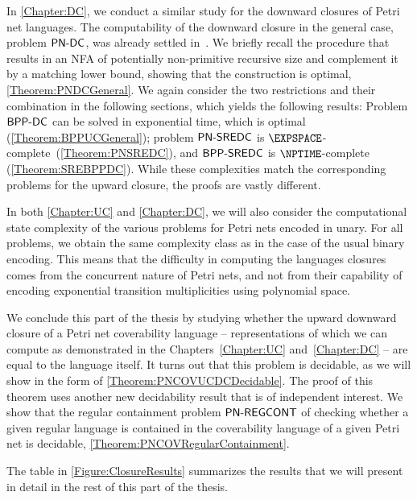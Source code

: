 \documentclass[../../diss.tex]{subfiles}
\begin{document}
In \cref{Chapter:DC}, we conduct a similar study for the downward closures of Petri net languages.
The computability of the downward closure in the general case, problem $\mathsf{PN\text{-}DC}$, was already settled in~\cite{HabermehlMW10}.
We briefly recall the procedure that results in an NFA of potentially non-primitive recursive size and complement it by a matching lower bound, showing that the construction is optimal, \cref{Theorem:PNDCGeneral}.
We again consider the two restrictions and their combination in the following sections, which yields the following results:
Problem $\mathsf{BPP\text{-}DC}$ can be solved in exponential time, which is optimal (\cref{Theorem:BPPUCGeneral}); problem $\mathsf{PN\text{-}SREDC}$ is $\EXPSPACE$-complete~(\cref{Theorem:PNSREDC}), and $\mathsf{BPP\text{-}SREDC}$ is $\NPTIME$-complete (\cref{Theorem:SREBPPDC}).
While these complexities match the corresponding problems for the upward closure, the proofs are vastly different.

In both \cref{Chapter:UC} and \cref{Chapter:DC}, we will also consider the computational \resp state complexity of the various problems for Petri nets encoded in unary.
For all problems, we obtain the same complexity class as in the case of the usual binary encoding.
This means that the difficulty in computing the languages closures comes from the concurrent nature of Petri nets, and not from their capability of encoding exponential transition multiplicities using polynomial space.

We conclude this part of the thesis by studying whether the upward \resp downward closure of a Petri net coverability language -- representations of which we can compute as demonstrated in the Chapters~\ref{Chapter:UC} and~\ref{Chapter:DC} -- are equal to the language itself.
It turns out that this problem is decidable, as we will show in the form of \cref{Theorem:PNCOVUCDCDecidable}.
The proof of this theorem uses another new decidability result that is of independent interest.
We show that the regular containment problem $\mathsf{PN\text{-}REGCONT}$ of checking whether a given regular language is contained in the coverability language of a given Petri net is decidable, \cref{Theorem:PNCOVRegularContainment}.

The table in \cref{Figure:ClosureResults} summarizes the results that we will present in detail in the rest of this part of the thesis.

\let\oldarraystretch\arraystretch%
\def\arraystretch{1.5}%
\end{document}
